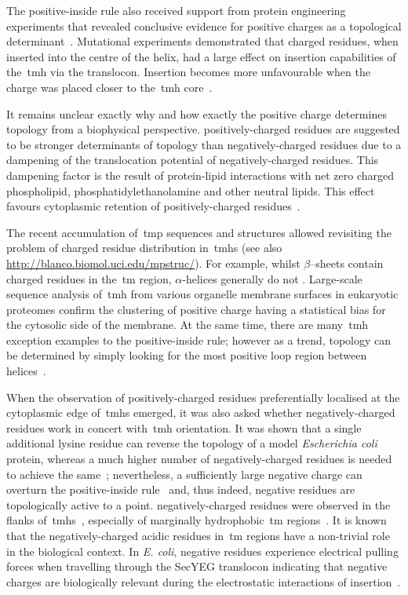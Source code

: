 The positive-inside rule also received support from protein engineering experiments that revealed conclusive evidence for positive charges as a topological determinant~\cite{VonHeijne1989, Beltzer1991, Kida2006, Nilsson1990}.
Mutational experiments demonstrated that charged residues, when inserted into the centre of the helix, had a large effect on insertion capabilities of the~\gls{tmh} via the translocon.
Insertion becomes more unfavourable when the charge was placed closer to the~\gls{tmh} core~\cite{Hessa2005}.

It remains unclear exactly why and how exactly the positive charge determines topology from a biophysical perspective.
positively\--charged residues are suggested to be stronger determinants of topology than negatively\--charged residues due to a dampening of the translocation potential of negatively\--charged residues.
This dampening factor is the result of protein-lipid interactions with net zero charged phospholipid, phosphatidylethanolamine and other neutral lipids.
This effect favours cytoplasmic retention of positively\--charged residues~\cite{Bogdanov2014}.

The recent accumulation of~\gls{tmp} sequences and structures allowed revisiting the problem of charged residue distribution in~\gls{tmh}s (see also \url{http://blanco.biomol.uci.edu/mpstruc/}).
For example, whilst \(\beta\)--sheets contain charged residues in the~\gls{tm} region, $\alpha$\--helices generally do not \cite{Ulmschneider2001}.
Large-scale sequence analysis of~\gls{tmh} from various organelle membrane surfaces in eukaryotic proteomes confirm the clustering of positive charge having a statistical bias for the cytosolic side of the membrane.
At the same time, there are many~\gls{tmh} exception examples to the positive-inside rule; however as a trend, topology can be determined by simply looking for the most positive loop region between helices~\cite{Sharpe2010, Baeza-Delgado2013}.

When the observation of positively\--charged residues preferentially localised at the cytoplasmic edge of~\gls{tmh}s emerged, it was also asked whether negatively\--charged residues work in concert with~\gls{tmh} orientation.
It was shown that a single additional lysine residue can reverse the topology of a model \textit{Escherichia coli} protein, whereas a much higher number of negatively\--charged residues is needed to achieve the same~\cite{Nilsson1990}; nevertheless, a sufficiently large negative charge can overturn the positive-inside rule~\cite{Andersson1993, Kim1994} and, thus indeed, negative residues are topologically active to a point.
negatively\--charged residues were observed in the flanks of~\gls{tmh}s~\cite{Baeza-Delgado2013}, especially of marginally hydrophobic~\gls{tm} regions~\cite{Delgado-Partin1998}.
It is known that the negatively\--charged acidic residues in~\gls{tm} regions have a non-trivial role in the biological context.
In \textit{E.
coli}, negative residues experience electrical pulling forces when travelling through the SecYEG translocon indicating that negative charges are biologically relevant during the electrostatic interactions of insertion~\cite{Ismail2012, Ismail2015}.

